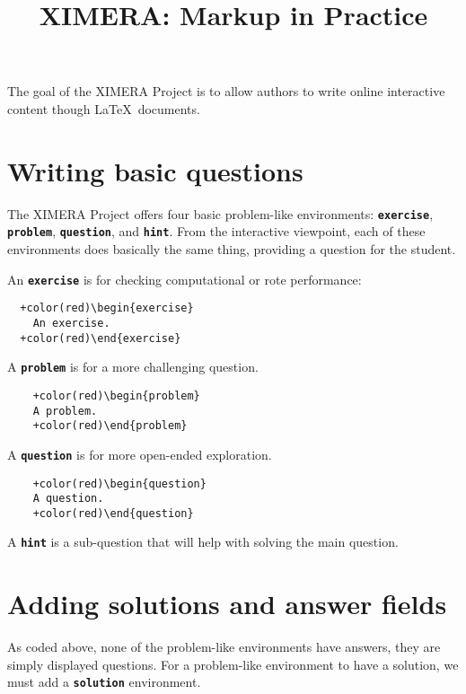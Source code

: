 \documentclass{amsart}
\newcommand\code[1]{{\bfseries\texttt{#1}}}
\begin{document}
\title{XIMERA: Markup in Practice}
\maketitle

The goal of the XIMERA Project is to allow authors to write online
interactive content though \LaTeX\ documents.


\section{Writing basic questions}


The XIMERA Project offers four basic problem-like environments:
\code{exercise}, \code{problem}, \code{question}, and
\code{hint}. From the interactive viewpoint, each of these
environments does basically the same thing, providing a question for
the student.

An \code{exercise} is for checking computational or rote performance:

\begin{Verbatim}
  +color(red)\begin{exercise}
    An exercise.
  +color(red)\end{exercise}
\end{Verbatim}

A \code{problem} is for a more challenging question.

\begin{Verbatim}
    +color(red)\begin{problem}
    A problem.
    +color(red)\end{problem}
\end{Verbatim}

A \code{question} is for more open-ended exploration. 

\begin{Verbatim}
    +color(red)\begin{question}
    A question.
    +color(red)\end{question}
\end{Verbatim}

A \code{hint} is a sub-question that will help with solving the main
question.



\section{Adding solutions and answer fields}


As coded above, none of the problem-like environments have answers,
they are simply displayed questions.  For a problem-like environment to
have a solution, we must add a \code{solution} environment.
\end{document}
